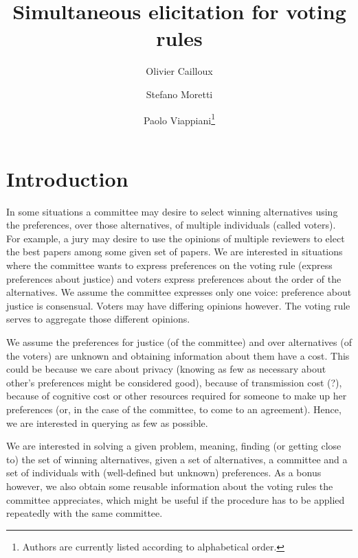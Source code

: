 \documentclass[version=last, pagesize, twoside=off, bibliography=totoc, DIV=calc, fontsize=14pt, a4paper, french, english]{scrartcl}
\begin{document}
\title{Simultaneous elicitation for voting rules}
\author{Olivier Cailloux}
\author{Stefano Moretti}
\author{Paolo Viappiani\footnote{Authors are currently listed according to alphabetical order.}}
\makeatletter
\makeatother
\maketitle

\section{Introduction}
In some situations a committee may desire to select winning alternatives using the preferences, over those alternatives, of multiple individuals (called voters). For example, a jury may desire to use the opinions of multiple reviewers to elect the best papers among some given set of papers. We are interested in situations where the committee wants to express preferences on the voting rule (express preferences about justice) and voters express preferences about the order of the alternatives. We assume the committee expresses only one voice: preference about justice is consensual. Voters may have differing opinions however. The voting rule serves to aggregate those different opinions.

We assume the preferences for justice (of the committee) and over alternatives (of the voters) are unknown and obtaining information about them have a cost. This could be because we care about privacy (knowing as few as necessary about other’s preferences might be considered good), because of transmission cost (?), because of cognitive cost or other resources required for someone to make up her preferences (or, in the case of the committee, to come to an agreement). Hence, we are interested in querying as few as possible.

We are interested in solving a given problem, meaning, finding (or getting close to) the set of winning alternatives, given a set of alternatives, a committee and a set of individuals with (well-defined but unknown) preferences. As a bonus however, we also obtain some reusable information about the voting rules the committee appreciates, which might be useful if the procedure has to be applied repeatedly with the same committee.
\end{document}
